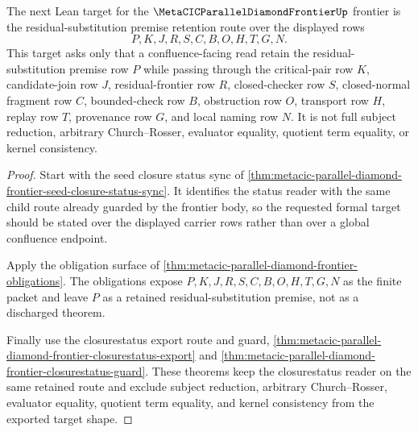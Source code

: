 \begin{theorem}
\label{thm:metacic-parallel-diamond-frontier-formal-target-request}
The next Lean target for the $\MetaCICParallelDiamondFrontierUp$ frontier is the residual-substitution premise retention route over the displayed rows
$$
P,K,J,R,S,C,B,O,H,T,G,N .
$$
This target asks only that a confluence-facing read retain the residual-substitution premise row $P$ while passing through the critical-pair row $K$, candidate-join row $J$, residual-frontier row $R$, closed-checker row $S$, closed-normal fragment row $C$, bounded-check row $B$, obstruction row $O$, transport row $H$, replay row $T$, provenance row $G$, and local naming row $N$. It is not full subject reduction, arbitrary Church--Rosser, evaluator equality, quotient term equality, or kernel consistency.
\end{theorem}
\begin{proof}
Start with the seed closure status sync of \autoref{thm:metacic-parallel-diamond-frontier-seed-closure-status-sync}. It identifies the status reader with the same child route already guarded by the frontier body, so the requested formal target should be stated over the displayed carrier rows rather than over a global confluence endpoint.

Apply the obligation surface of \autoref{thm:metacic-parallel-diamond-frontier-obligations}. The obligations expose $P,K,J,R,S,C,B,O,H,T,G,N$ as the finite packet and leave $P$ as a retained residual-substitution premise, not as a discharged theorem.

Finally use the closurestatus export route and guard, \autoref{thm:metacic-parallel-diamond-frontier-closurestatus-export} and \autoref{thm:metacic-parallel-diamond-frontier-closurestatus-guard}. These theorems keep the closurestatus reader on the same retained route and exclude subject reduction, arbitrary Church--Rosser, evaluator equality, quotient term equality, and kernel consistency from the exported target shape.
\end{proof}

